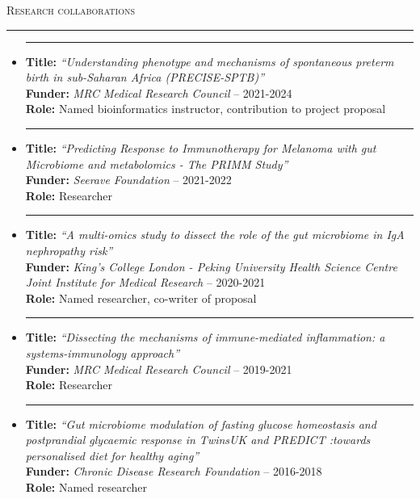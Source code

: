\documentclass[a4paper,10pt]{article}
\newcommand{\mediumtitle}[1]{
	\vspace{0.2cm}
	{\noindent
	\Large \textsc{#1}\\[-2ex]
	\hrule
	\vspace{0.2cm}}
}
\newcommand{\noitem}{\item[]}
\begin{document}

\mediumtitle{Research collaborations}

\begin{itemize}[leftmargin=*,itemsep=1.2ex]

	\noitem\rule{1mm}{0pt}  \begin{minipage}[t]{0.94\textwidth}
		\textbf{Title:} \emph{``Understanding phenotype and mechanisms of spontaneous preterm birth in sub-Saharan Africa (PRECISE-SPTB)''}\\
		\textbf{Funder:} \emph{MRC Medical Research Council} -- 2021-2024\\
		\textbf{Role:} Named bioinformatics instructor,  contribution to project proposal
	\end{minipage}
	
	\noitem\rule{1mm}{0pt}  \begin{minipage}[t]{0.94\textwidth}
		\textbf{Title:} \emph{``Predicting Response to Immunotherapy for Melanoma with gut Microbiome and metabolomics - The PRIMM Study''}\\
		\textbf{Funder:} \emph{Seerave Foundation} -- 2021-2022\\
		\textbf{Role:} Researcher
	\end{minipage}

	\noitem\rule{1mm}{0pt}  \begin{minipage}[t]{0.94\textwidth}
		\textbf{Title:} \emph{``A multi-omics study to dissect the role of the gut microbiome in IgA nephropathy risk''}\\
		\textbf{Funder:} \emph{King's College London - Peking University Health Science Centre Joint Institute for Medical Research} -- 2020-2021\\
		\textbf{Role:} Named researcher, co-writer of proposal
	\end{minipage}
	
	\noitem\rule{1mm}{0pt}  \begin{minipage}[t]{0.94\textwidth}
		\textbf{Title:} \emph{``Dissecting the mechanisms of immune-mediated inflammation: a systems-immunology approach''}\\
		\textbf{Funder:} \emph{MRC Medical Research Council} -- 2019-2021\\
		\textbf{Role:} Researcher
	\end{minipage}
	
	\noitem\rule{1mm}{0pt}  \begin{minipage}[t]{0.94\textwidth}
		\textbf{Title:} \emph{``Gut microbiome modulation of fasting glucose homeostasis and postprandial glycaemic response in TwinsUK and PREDICT :towards personalised diet for healthy aging''}\\
		\textbf{Funder:} \emph{Chronic Disease Research Foundation} -- 2016-2018\\
		\textbf{Role:} Named researcher
	\end{minipage}
	

\end{itemize}
\end{document}
